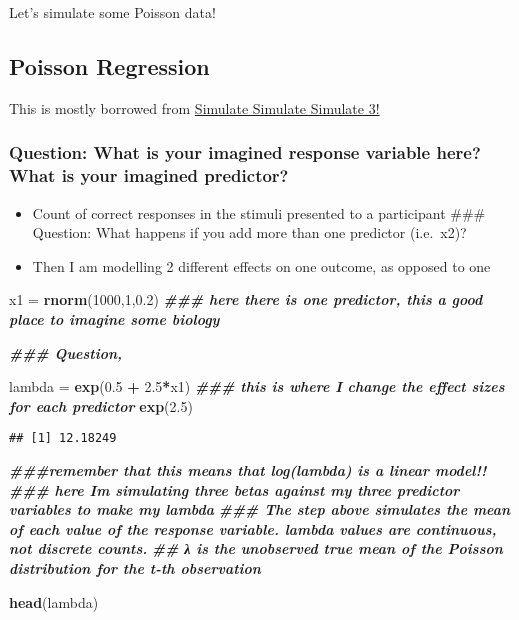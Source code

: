 \documentclass[
]{article}
\newenvironment{Shaded}{\begin{snugshade}}{\end{snugshade}}
\newcommand{\DecValTok}[1]{\textcolor[rgb]{0.00,0.00,0.81}{#1}}
\newcommand{\DocumentationTok}[1]{\textcolor[rgb]{0.56,0.35,0.01}{\textbf{\textit{#1}}}}
\newcommand{\FloatTok}[1]{\textcolor[rgb]{0.00,0.00,0.81}{#1}}
\newcommand{\FunctionTok}[1]{\textcolor[rgb]{0.13,0.29,0.53}{\textbf{#1}}}
\newcommand{\NormalTok}[1]{#1}
\newcommand{\OtherTok}[1]{\textcolor[rgb]{0.56,0.35,0.01}{#1}}
\newcommand{\SpecialCharTok}[1]{\textcolor[rgb]{0.81,0.36,0.00}{\textbf{#1}}}
\providecommand{\tightlist}{%
  \setlength{\itemsep}{0pt}\setlength{\parskip}{0pt}}
\begin{document}
Let's simulate some Poisson data!

\subsection{Poisson Regression}\label{poisson-regression}

This is mostly borrowed from
\href{https://aosmith.rbind.io/2018/07/18/simulate-poisson-edition/}{Simulate
Simulate Simulate 3!}

\subsubsection{Question: What is your imagined response variable here?
What is your imagined
predictor?}\label{question-what-is-your-imagined-response-variable-here-what-is-your-imagined-predictor}

\begin{itemize}
\tightlist
\item
  Count of correct responses in the stimuli presented to a participant
  \#\#\# Question: What happens if you add more than one predictor
  (i.e.~x2)?
\item
  Then I am modelling 2 different effects on one outcome, as opposed to
  one
\end{itemize}

\begin{Shaded}
\begin{Highlighting}[]
\NormalTok{x1 }\OtherTok{=} \FunctionTok{rnorm}\NormalTok{(}\DecValTok{1000}\NormalTok{,}\DecValTok{1}\NormalTok{,}\FloatTok{0.2}\NormalTok{) }\DocumentationTok{\#\#\# here there is one predictor, this a good place to imagine some biology}

\DocumentationTok{\#\#\# Question, }

\NormalTok{lambda }\OtherTok{=} \FunctionTok{exp}\NormalTok{(}\FloatTok{0.5} \SpecialCharTok{+} \FloatTok{2.5}\SpecialCharTok{*}\NormalTok{x1) }\DocumentationTok{\#\#\# this is where I change the effect sizes for each predictor}
\FunctionTok{exp}\NormalTok{(}\FloatTok{2.5}\NormalTok{)}
\end{Highlighting}
\end{Shaded}

\begin{verbatim}
## [1] 12.18249
\end{verbatim}

\begin{Shaded}
\begin{Highlighting}[]
\DocumentationTok{\#\#\#remember that this means that log(lambda) is a linear model!!}
\DocumentationTok{\#\#\# here I\textquotesingle{}m simulating three betas against my three predictor variables to make my lambda}
\DocumentationTok{\#\#\# The step above simulates the mean of each value of the response variable. lambda values are continuous, not discrete counts.}
\DocumentationTok{\#\# λ is the unobserved true mean of the Poisson distribution for the t{-}th observation}

\FunctionTok{head}\NormalTok{(lambda)}
\end{Highlighting}
\end{Shaded}
\end{document}
